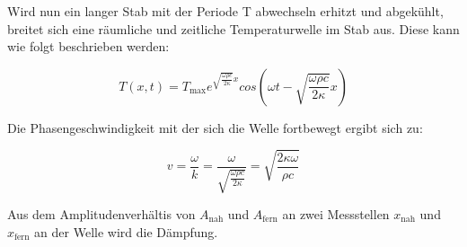       Wird nun ein langer Stab mit der Periode T abwechseln erhitzt und abgekühlt, breitet sich eine räumliche und zeitliche Temperaturwelle im Stab aus. 
      Diese kann wie folgt beschrieben werden: 

      \begin{equation}
      T(x,t) = T_\text{max} e^{\sqrt{\frac{\omega \rho c}{2 \kappa}}x} cos(\omega t - \sqrt{\frac{\omega \rho c}{2 \kappa}} x)
        \label{eqn:temperaturwelle}
      \end{equation}  

      Die Phasengeschwindigkeit mit der sich die Welle fortbewegt ergibt sich zu:

      \begin{equation}
      v = \frac{\omega}{k} = \frac{\omega}{\sqrt{\frac{\omega \rho c}{2 \kappa}}} = \sqrt{\frac{2 \kappa \omega}{\rho c}}
        \label{eqn:phasengeschwindigkeit}
      \end{equation}

      Aus dem Amplitudenverhältis von $A_\text{nah}$ und $A_\text{fern}$ an zwei Messstellen $x_\text{nah}$ und $x_\text{fern}$ an der Welle wird die Dämpfung.

